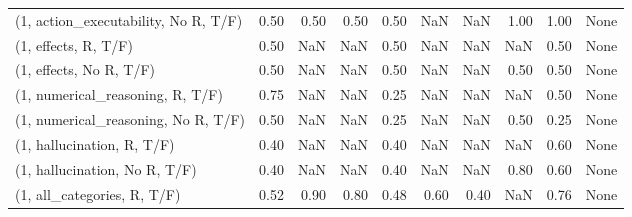 \begin{table*}[h!]
\begin{adjustbox}{width=2\columnwidth,center}
\begin{tabular}{lrrr|rrr|rrr}
(1, action\_executability, No R, T/F) &                      0.50 &                  0.50 &                      0.50 &                          0.50 &                       NaN &                           NaN &                                   1.00 &                               1.00 &                                  None \\
(1, effects, R, T/F)                 &                      0.50 &                   NaN &                       NaN &                          0.50 &                       NaN &                           NaN &                                    NaN &                               0.50 &                                  None \\
(1, effects, No R, T/F)              &                      0.50 &                   NaN &                       NaN &                          0.50 &                       NaN &                           NaN &                                   0.50 &                               0.50 &                                  None \\
(1, numerical\_reasoning, R, T/F)     &                      0.75 &                   NaN &                       NaN &                          0.25 &                       NaN &                           NaN &                                    NaN &                               0.50 &                                  None \\
(1, numerical\_reasoning, No R, T/F)  &                      0.50 &                   NaN &                       NaN &                          0.25 &                       NaN &                           NaN &                                   0.50 &                               0.25 &                                  None \\
(1, hallucination, R, T/F)           &                      0.40 &                   NaN &                       NaN &                          0.40 &                       NaN &                           NaN &                                    NaN &                               0.60 &                                  None \\
(1, hallucination, No R, T/F)        &                      0.40 &                   NaN &                       NaN &                          0.40 &                       NaN &                           NaN &                                   0.80 &                               0.60 &                                  None \\
(1, all\_categories, R, T/F)          &                      0.52 &                  0.90 &                      0.80 &                          0.48 &                      0.60 &                          0.40 &                                    NaN &                               0.76 &                                  None \\

\end{tabular}
\end{adjustbox}
\end{table*}
